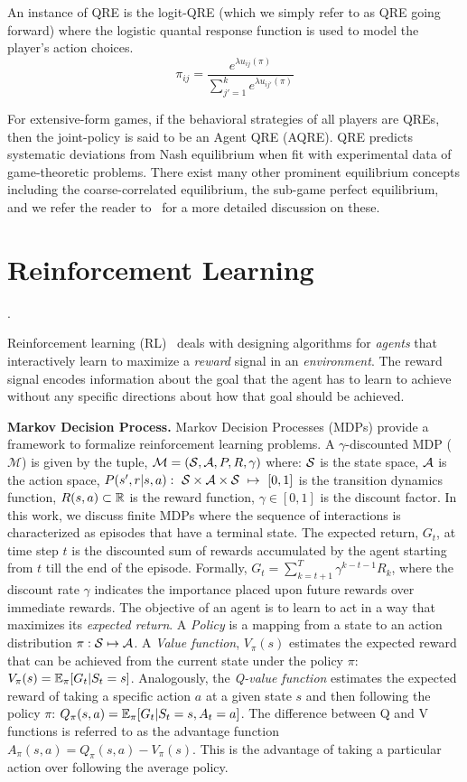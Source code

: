 An instance of QRE is the logit-QRE (which we simply refer to as QRE going forward) where the
logistic quantal response function is used to model the player's action choices.
$$ \pi_{ij} = \frac{e^{\lambda u_{ij}(\pi)}}{\sum_{j'=1}^k e^{\lambda u_{ij'}(\pi)}}$$

For extensive-form games, if the behavioral strategies of all players are QREs, then the
joint-policy is said to be an Agent QRE (AQRE).
QRE predicts systematic deviations from Nash equilibrium when fit with experimental data of
game-theoretic problems.
There exist many other prominent equilibrium concepts including the coarse-correlated equilibrium,
the sub-game perfect equilibrium, and we refer the reader
to~\cite{shohamMultiagent2008,osborneintroduction2004} for a more detailed discussion on these.

\section{Reinforcement
  Learning}
.

Reinforcement learning (RL)~\cite{suttonReinforcement2018} deals with designing algorithms for
\textit{agents} that interactively learn to maximize a \textit{reward} signal in an
\textit{environment}.
The reward signal encodes information about the goal that the agent has to learn to achieve without
any specific directions about how that goal should be achieved.

\textbf{Markov Decision Process.}
Markov Decision Processes (MDPs) provide a framework to formalize reinforcement learning problems.
A $\gamma$-discounted MDP ($\mathcal{M}$) is given by the tuple, $\mathcal{M}=(\mathcal{S}, \mathcal{A}, P, R,
	\gamma)$ where: $\mathcal{S}$ is the state space, $\mathcal{A}$ is the action space,
$P(s',r|s,a):~\mathcal{S}\times\mathcal{A}\times\mathcal{S}~\mapsto~[0,1]$ is the transition dynamics function,
$R(s,a) \subset \mathbb{R}$ is the reward function, $\gamma \in [0,1]$ is the discount factor.
In this work, we discuss finite MDPs where the sequence of interactions is characterized as
episodes that have a terminal state.
The expected return, $G_t$, at time step $t$ is the discounted sum of rewards accumulated by the
agent starting from $t$ till the end of the episode.
Formally, $G_t = \sum_{k=t+1}^{T} \gamma^{k-t-1} R_k$, where the discount rate $\gamma$ indicates
the importance placed upon future rewards over immediate rewards.
The objective of an agent is to learn to act in a way that maximizes its \textit{expected return}.
A \textit{Policy} is a mapping from a state to an action distribution $\pi: \mathcal{S} \mapsto \mathcal{A}$.
A \textit{Value function}, $V_{\pi}(s)$ estimates the expected reward that can be achieved from the
current state under the policy $\pi$: $V_{\pi}(s) = \mathbb{E}_{\pi}[G_t | S_t = s]$.
Analogously, the \textit{Q-value function} estimates the expected reward of taking a specific
action $a$ at a given state $s$ and then following the policy $\pi$: $ Q_{\pi}(s, a) = \mathbb{E}_{\pi}[G_t
		| S_t = s, A_t = a] $.
The difference between Q and V functions is referred to as the advantage function $A_\pi(s,a) =
	Q_\pi(s,a) - V_\pi(s)$.
This is the advantage of taking a particular action over following the average policy.

